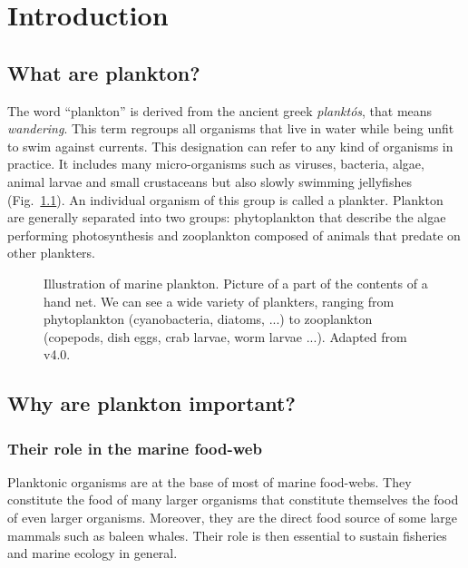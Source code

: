 \chapter{Introduction}\label{chap:intro}

\section{What are plankton?}

The word ``plankton'' is derived from the ancient greek \textit{planktós}, that means \textit{wandering}.
This term regroups all organisms that live in water while being unfit to swim against currents.
This designation can refer to any kind of organisms in practice.
It includes many micro-organisms such as viruses, bacteria, algae, animal larvae and small crustaceans but also slowly swimming jellyfishes (Fig.~\ref{fig:marine_plankton}).
An individual organism of this group is called a plankter.
Plankton are generally separated into two groups: phytoplankton that describe the algae performing photosynthesis and zooplankton composed of animals that predate on other plankters.
\begin{figure}
	\centering
	\def\svgwidth{0.9\textwidth}
	
  	\caption[Illustration of marine plankton.]{
  		Illustration of marine plankton. Picture of a part of the contents of a hand net. 
  		We can see a wide variety of plankters, ranging from phytoplankton (cyanobacteria, diatoms, ...) to zooplankton (copepods, dish eggs, crab larvae, worm larvae ...).
  		Adapted from \citet{nadeau2016microbial} \ccbysa ~ v4.0.
  	}
  	\label{fig:marine_plankton}
\end{figure}

\section{Why are plankton important?}

\subsection{Their role in the marine food-web}

Planktonic organisms are at the base of most of marine food-webs.
They constitute the food of many larger organisms that constitute themselves the food of even larger organisms. 
Moreover, they are the direct food source of some large mammals such as baleen whales.
Their role is then essential to sustain fisheries and marine ecology in general.

